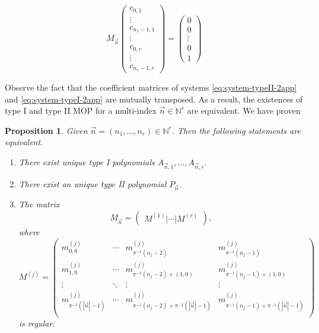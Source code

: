 \documentclass[12pt,a4]{report}
\theoremstyle{plain}
\newtheorem{proposition}[theorem]{Proposition}
\newcommand{\N}[0]{\mathbb{N}}
\begin{document}
\begin{equation}
    \label{eq:system-typeI-2app}
    M_{\vec n} \begin{pmatrix}
        c_{0,1} \\ \vdots \\ c_{n_1-1,1} \\ \hline \vdots \\ \hline c_{0,r} \\ \vdots \\ c_{n_r-1,r} 
    \end{pmatrix} = \begin{pmatrix}
        0 \\ 0 \\ \vdots \\ 0 \\ 1
    \end{pmatrix} 
\end{equation}

Observe the fact that the coefficient matrices of systems \eqref{eq:system-typeII-2app} and \eqref{eq:system-typeI-2app} are mutually transposed. As a result, the existences of type I and type II MOP for a multi-index $\vec n\in\N^r$ are equivalent. We have proven

\begin{proposition}
    \label{prop:equivalence-2-app}
    Given $\vec n=(n_1,\dots,n_r)\in\N^r$. Then the following statements are equivalent.
    \begin{enumerate}
        \item There exist unique type I polynomials $A_{\vec n,1},\dots,A_{\vec n,r}$.
        \item There exist an unique type II polynomial $P_{\vec n}$.
        \item The matrix
            \begin{equation}
                M_{\vec n} = \begin{pmatrix}
                    M^{(1)} | \cdots | M^{(r)}
                   \end{pmatrix},
            \end{equation} 
            where
            \begin{equation}
                M^{(j)} = \begin{pmatrix}
                    m_{0,0}^{(j)} & \cdots & m_{\pi^{-1}(n_j-2)}^{(j)}  & m_{\pi^{-1}(n_j-1)}^{(j)}  \\
                    m_{1,0}^{(j)} & \cdots & m_{\pi^{-1}(n_j-2)+(1,0)}^{(j)}  & m_{\pi^{-1}(n_j-1)+(1,0)}^{(j)}  \\
                    \vdots & \ddots & \vdots & \vdots \\
                    m_{\pi^{-1}(|\vec n|-1)}^{(j)} & \cdots & m_{\pi^{-1}(n_j-2)+\pi^{-1}(|\vec n|-1)}^{(j)}  & m_{\pi^{-1}(n_j-1)+\pi^{-1}(|\vec n|-1)}^{(j)}  \\
                  \end{pmatrix}
            \end{equation}
            is regular.
    \end{enumerate}
\end{proposition}
\end{document}
